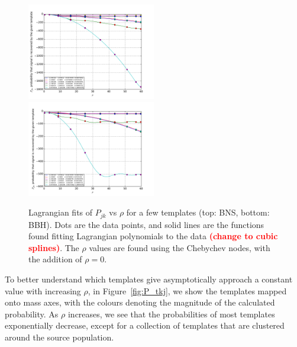\documentclass[twocolumn,showpacs,unsortedaddress,superscriptaddress,showkeys,nofootinbib,preprintnumbers,letterpaper]{revtex4-1}
\newcommand{\FIXME}[1]{\textcolor{red}{\textbf{#1}}}
\begin{document}
\begin{figure}
\includegraphics[width=0.5\textwidth]{lagrangian_fit_Ozel.pdf}
\includegraphics[width=0.5\textwidth]{lagrangian_fit_Kiziltan.pdf}
\caption{Lagrangian fits of $P_{jk}$ vs $\rho$ for a few templates (top: BNS, bottom: BBH). Dots are the data points, and solid lines are the functions found fitting Lagrangian polynomials to the data \FIXME{(change to cubic splines)}. The $\rho$ values are found using the Chebychev nodes, with the addition of $\rho=0$.}
\label{fig:Pvsrho}
\end{figure}

To better understand which templates give asymptotically approach a constant value with increasing $\rho$, in Figure~\ref{fig:P_tkj}, we show the templates mapped onto mass axes, with the colours denoting the magnitude of the calculated probability. As $\rho$ increases, we see that the probabilities of most templates exponentially decrease, except for a collection of templates that are clustered around the source population.
\end{document}

